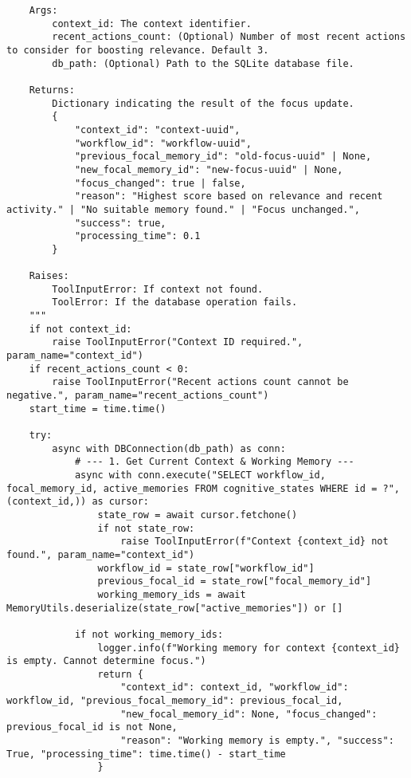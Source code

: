 \documentclass[12pt,a4paper]{article}
\begin{document}
\begin{pageablecode}
\begin{verbatim}
    Args:
        context_id: The context identifier.
        recent_actions_count: (Optional) Number of most recent actions to consider for boosting relevance. Default 3.
        db_path: (Optional) Path to the SQLite database file.

    Returns:
        Dictionary indicating the result of the focus update.
        {
            "context_id": "context-uuid",
            "workflow_id": "workflow-uuid",
            "previous_focal_memory_id": "old-focus-uuid" | None,
            "new_focal_memory_id": "new-focus-uuid" | None,
            "focus_changed": true | false,
            "reason": "Highest score based on relevance and recent activity." | "No suitable memory found." | "Focus unchanged.",
            "success": true,
            "processing_time": 0.1
        }

    Raises:
        ToolInputError: If context not found.
        ToolError: If the database operation fails.
    """
    if not context_id:
        raise ToolInputError("Context ID required.", param_name="context_id")
    if recent_actions_count < 0:
        raise ToolInputError("Recent actions count cannot be negative.", param_name="recent_actions_count")
    start_time = time.time()

    try:
        async with DBConnection(db_path) as conn:
            # --- 1. Get Current Context & Working Memory ---
            async with conn.execute("SELECT workflow_id, focal_memory_id, active_memories FROM cognitive_states WHERE id = ?", (context_id,)) as cursor:
                state_row = await cursor.fetchone()
                if not state_row:
                    raise ToolInputError(f"Context {context_id} not found.", param_name="context_id")
                workflow_id = state_row["workflow_id"]
                previous_focal_id = state_row["focal_memory_id"]
                working_memory_ids = await MemoryUtils.deserialize(state_row["active_memories"]) or []

            if not working_memory_ids:
                logger.info(f"Working memory for context {context_id} is empty. Cannot determine focus.")
                return {
                    "context_id": context_id, "workflow_id": workflow_id, "previous_focal_memory_id": previous_focal_id,
                    "new_focal_memory_id": None, "focus_changed": previous_focal_id is not None,
                    "reason": "Working memory is empty.", "success": True, "processing_time": time.time() - start_time
                }


\end{verbatim}
\end{pageablecode}
\end{document}
